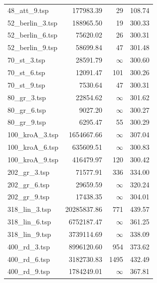 \begin{table}[H]
\begin{tabular}{|l|r|r|r|}
48\_att\_9.tsp & 177983.39 & 29 & 108.74 \\
52\_berlin\_3.tsp & 188965.50 & 19 & 300.33 \\
52\_berlin\_6.tsp & 75620.02 & 26 & 300.31 \\
52\_berlin\_9.tsp & 58699.84 & 47 & 301.48 \\
70\_st\_3.tsp & 28591.79 & $\infty$ & 300.60 \\
70\_st\_6.tsp & 12091.47 & 101 & 300.26 \\
70\_st\_9.tsp & 7530.64 & 47 & 300.31 \\
80\_gr\_3.tsp & 22854.62 & $\infty$ & 301.62 \\
80\_gr\_6.tsp & 9027.20 & $\infty$ & 300.27 \\
80\_gr\_9.tsp & 6295.47 & 55 & 300.29 \\
100\_kroA\_3.tsp & 1654667.66 & $\infty$ & 307.04 \\
100\_kroA\_6.tsp & 635609.51 & $\infty$ & 300.83 \\
100\_kroA\_9.tsp & 416479.97 & 120 & 300.42 \\
202\_gr\_3.tsp & 71577.91 & 336 & 334.00 \\
202\_gr\_6.tsp & 29659.59 & $\infty$ & 320.24 \\
202\_gr\_9.tsp & 17438.35 & $\infty$ & 304.01 \\
318\_lin\_3.tsp & 20285837.86 & 771 & 439.57 \\
318\_lin\_6.tsp & 6752187.47 & $\infty$ & 361.25 \\
318\_lin\_9.tsp & 3739114.69 & $\infty$ & 338.09 \\
400\_rd\_3.tsp & 8996120.60 & 954 & 373.62 \\
400\_rd\_6.tsp & 3182730.83 & 1495 & 432.49 \\
400\_rd\_9.tsp & 1784249.01 & $\infty$ & 367.81 \\
\hline
\end{tabular}
\end{table}
